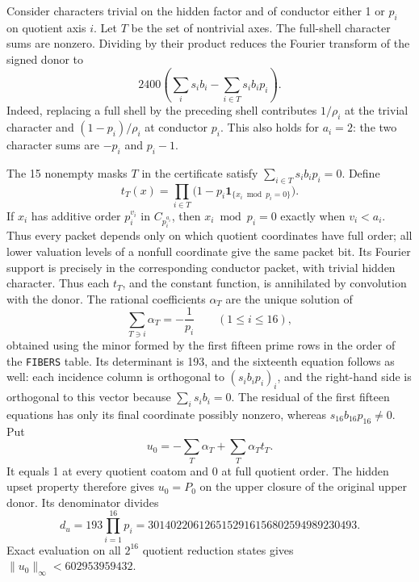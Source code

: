 \documentclass[11pt]{article}
\numberwithin{equation}{section}
\theoremstyle{definition}
\theoremstyle{remark}
\newcommand{\ind}{\mathbf1}
\begin{document}
Consider characters trivial on the hidden factor and of conductor either
1 or $p_i$ on quotient axis $i$.  Let $T$ be the set of nontrivial axes.
The full-shell character sums are nonzero.  Dividing by their product
reduces the Fourier transform of the signed donor to
\begin{equation}\label{h100:upper-transform}
 2400\left(\sum_i s_i b_i-\sum_{i\in T}s_i b_i p_i\right).
\end{equation}
Indeed, replacing a full shell by the preceding shell contributes
$1/\rho_i$ at the trivial character and $(1-p_i)/\rho_i$ at conductor
$p_i$.  This also holds for $a_i=2$: the two character sums are $-p_i$
and $p_i-1$.

The 15 nonempty masks $T$ in the certificate satisfy
$\sum_{i\in T}s_i b_i p_i=0$.  Define
\[
 t_T(x)=\prod_{i\in T}
   \bigl(1-p_i\ind_{\{x_i\bmod p_i=0\}}\bigr).
\]
If $x_i$ has additive order $p_i^{v_i}$ in $C_{p_i^{a_i}}$, then
$x_i\bmod p_i=0$ exactly when $v_i<a_i$.  Thus every packet depends
only on which quotient coordinates have full order; all lower
valuation levels of a nonfull coordinate give the same packet bit.
Its Fourier support is precisely in the corresponding conductor packet,
with trivial hidden character.  Thus each $t_T$, and the constant
function, is annihilated by convolution with the donor.  The rational
coefficients $\alpha_T$ are the unique solution of
\[
 \sum_{T\ni i}\alpha_T=-\frac1{p_i}\qquad(1\le i\le16),
\]
obtained using the minor formed by the first fifteen prime rows in the
order of the \texttt{FIBERS} table.  Its determinant is 193, and the
sixteenth equation follows as well: each incidence column is orthogonal
to $(s_i b_i p_i)_i$, and the right-hand side is orthogonal to this
vector because $\sum_i s_i b_i=0$. The residual of the first fifteen
equations has only its final coordinate possibly nonzero, whereas
$s_{16}b_{16}p_{16}\ne0$.  Put
\begin{equation}\label{h100:upper-witness}
 u_0=-\sum_T\alpha_T+\sum_T\alpha_T t_T.
\end{equation}
It equals 1 at every quotient coatom and 0 at full quotient order.
The hidden upset property therefore gives $u_0=P_0$ on the upper
closure of the original upper donor.  Its denominator divides
\[
 d_u=193\prod_{i=1}^{16}p_i
 =3014022061265152916156802594989230493.
\]
Exact evaluation on all $2^{16}$ quotient reduction states gives
$\|u_0\|_\infty<602953959432$.
\end{document}
